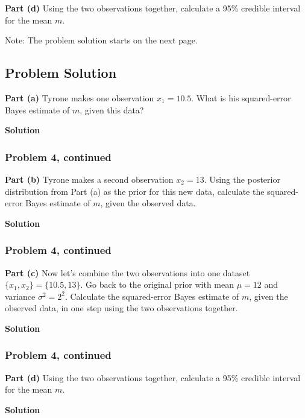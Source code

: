 \documentclass[12pt]{article}
\theoremstyle{definition}
\begin{document}
\bigskip
\noindent
{\bf Part (d)} Using the two observations together, calculate a 95\% credible interval for the mean $m$.

\bigskip
\noindent
Note: The problem solution starts on the next page.

\newpage
\subsection*{Problem Solution}

\noindent
{\bf Part (a)} Tyrone makes one observation $x_1 = 10.5$. What is his squared-error Bayes estimate of $m$, given this data?

\bigskip
\noindent
{\bf Solution} 



\newpage
\subsubsection*{Problem 4, continued}

\noindent
{\bf Part (b)} Tyrone makes a second observation $x_2 = 13$. Using the posterior distribution from Part (a) as the prior for this new data, calculate the squared-error Bayes estimate of $m$, given the observed data.

\bigskip
\noindent
{\bf Solution} 




\newpage
\subsubsection*{Problem 4, continued}

\noindent
{\bf Part (c)} Now let's combine the two observations into one dataset $\{x_1, x_2\} = \{10.5, 13\}$. Go back to the original prior with mean $\mu = 12$ and variance $\sigma^2 = 2^2$. Calculate the squared-error Bayes estimate of $m$, given the observed data, in one step using the two observations together.

\bigskip
\noindent
{\bf Solution} 


\newpage
\subsubsection*{Problem 4, continued}

\noindent
{\bf Part (d)} Using the two observations together, calculate a 95\% credible interval for the mean $m$.

\bigskip
\noindent
{\bf Solution} 
\end{document}
